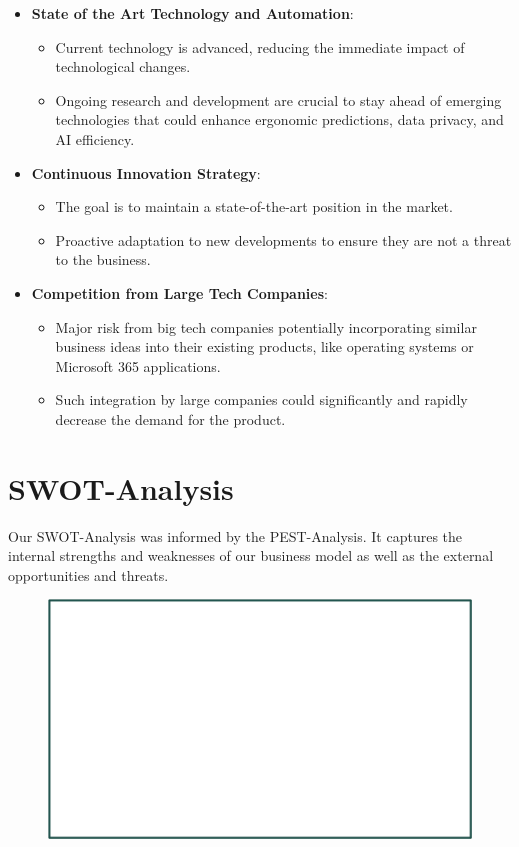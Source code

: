 \begin{itemize}
  \item \textbf{State of the Art Technology and Automation}:
  \begin{itemize}
    \item Current technology is advanced, reducing the immediate impact of technological changes.
    \item Ongoing research and development are crucial to stay ahead of emerging technologies that could enhance ergonomic predictions, data privacy, and AI efficiency.
  \end{itemize}

  \item \textbf{Continuous Innovation Strategy}:
  \begin{itemize}
    \item The goal is to maintain a state-of-the-art position in the market.
    \item Proactive adaptation to new developments to ensure they are not a threat to the business.
  \end{itemize}

  \item \textbf{Competition from Large Tech Companies}:
  \begin{itemize}
    \item Major risk from big tech companies potentially incorporating similar business ideas into their existing products, like operating systems or Microsoft 365 applications.
    \item Such integration by large companies could significantly and rapidly decrease the demand for the product.
  \end{itemize}
\end{itemize}

\section{SWOT-Analysis}

Our SWOT-Analysis was informed by the PEST-Analysis. It captures the internal strengths and weaknesses of our business model as well as the external opportunities and threats.

\begin{figure}[H]
    \includegraphics[width=17.5cm]{SWOT_analysis.png}
\end{figure}
